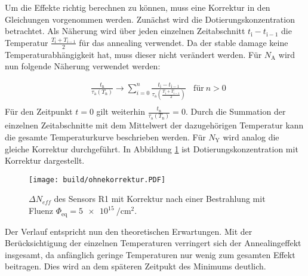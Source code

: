 Um die Effekte richtig berechnen zu können, muss eine Korrektur in den
Gleichungen vorgenommen werden.
Zunächst wird die Dotierungskonzentration betrachtet. Als Näherung wird über
jeden einzelnen Zeitabschnitt $t_{\mathrm{i}} - t_{\mathrm{i-1}}$ die
Temperatur $\frac{T_{\mathrm{i}} +T_{\mathrm{i-1}}}{2}$ für das annealing verwendet.
Da der stable damage keine Temperaturabhängigkeit hat, muss dieser nicht
verändert werden. Für $N_{\mathrm{A}}$ wird nun folgende Näherung
verwendet werden:

\begin{align}
  &\frac{t_{\mathrm{n}}}{\tau_{\mathrm{a}}(T_{\mathrm{n}})} \rightarrow \sum_{i=0}^n  \frac{t_{\mathrm{i}} - t_{\mathrm{i-1}}}{\tau_{\mathrm{a}}(\frac{T_{\mathrm{i}} +T_{\mathrm{i-1}}}{2})} \:\:\:\: \text{für} \: n>0 \\
\end{align}
Für den Zeitpunkt $t=0$ gilt weiterhin $\frac{t_{\mathrm{n}}}{\tau_{\mathrm{a}}(T_{\mathrm{n}})} = 0$.
Durch die Summation der einzelnen Zeitabschnitte mit dem Mittelwert der dazugehörigen
Temperatur kann die gesamte Temperaturkurve beschrieben werden. Für $N_{\mathrm{Y}}$
wird analog die gleiche Korrektur durchgeführt.
In Abbildung \ref{fig:korrektur_N_eff} ist Dotierungskonzentration mit Korrektur dargestellt.


\begin{figure}
    \texttt{[image: build/ohnekorrektur.PDF]}
\caption{$\Delta N_{eff}$ des Sensors R1 mit Korrektur nach einer Bestrahlung mit Fluenz $\Phi_{\mathrm{eq}} = \SI{5e15}{\per\centi\meter\squared}.$}
\label{fig:korrektur_N_eff}
\end{figure}


Der Verlauf entspricht nun den theoretischen Erwartungen. Mit der Berücksichtigung
der einzelnen Temperaturen verringert sich der Annealingeffekt insgesamt, da anfänglich
geringe Temperaturen nur wenig zum gesamten Effekt beitragen. Dies wird
an dem späteren Zeitpukt des Minimums deutlich.

